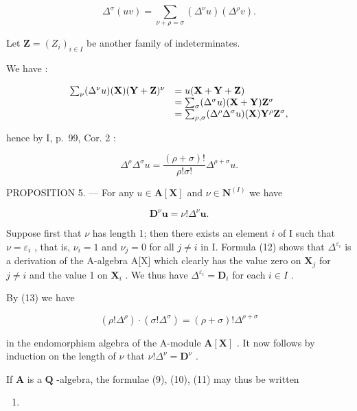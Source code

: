 \[
\Delta^ {\sigma} (u v) = \sum_ {\nu + \rho = \sigma} (\Delta^ {\nu} u) (\Delta^ {\rho} v).
\]

Let \(\mathbf{Z} = (Z_i)_{i\in I}\) be another family of indeterminates.

We have :

\[
\begin{array}{r l} \sum_ {\nu} (\Delta^ {\nu} u) (\mathbf {X}) (\mathbf {Y} + \mathbf {Z}) ^ {\nu} & = u (\mathbf {X} + \mathbf {Y} + \mathbf {Z}) \\ & = \sum_ {\sigma} (\Delta^ {\sigma} u) (\mathbf {X} + \mathbf {Y}) \mathbf {Z} ^ {\sigma} \\ & = \sum_ {\rho , \sigma} (\Delta^ {\rho} \Delta^ {\sigma} u) (\mathbf {X}) \mathbf {Y} ^ {\rho} \mathbf {Z} ^ {\sigma}, \end{array}
\]

hence by I, p.~99, Cor. 2 :

\[
\Delta^ {\rho} \Delta^ {\sigma} u = \frac {(\rho + \sigma) !}{\rho ! \sigma !} \Delta^ {\rho + \sigma} u.\tag{13}
\]

PROPOSITION 5. --- For any \(u \in \mathbf{A}[\mathbf{X}]\) and \(\nu \in \mathbf{N}^{(I)}\) we have

\[
\mathbf {D} ^ {\nu} \boldsymbol {u} = \nu ! \Delta^ {\nu} \boldsymbol {u}.
\]

Suppose first that \(\nu\) has length 1; then there exists an element \(i\) of I such that \(\nu = \varepsilon_i\) , that is, \(\nu_i = 1\) and \(\nu_j = 0\) for all \(j \neq i\) in I. Formula (12) shows that \(\Delta^{\varepsilon_i}\) is a derivation of the A-algebra A{[}X{]} which clearly has the value zero on \(\mathbf{X}_j\) for \(j \neq i\) and the value 1 on \(\mathbf{X}_i\) . We thus have \(\Delta^{\varepsilon_i} = \mathbf{D}_i\) for each \(i \in I\) .

By (13) we have

\[
(\rho ! \Delta^ {\rho}) \cdot (\sigma ! \Delta^ {\sigma}) = (\rho + \sigma)! \Delta^ {\rho + \sigma}\tag{14}
\]

in the endomorphism algebra of the A-module \(\mathbf{A}[\mathbf{X}]\) . It now follows by induction on the length of \(\nu\) that \(\nu! \Delta^{\nu} = \mathbf{D}^{\nu}\) .

If \(\mathbf{A}\) is a \(\mathbf{Q}\) -algebra, the formulae (9), (10), (11) may thus be written

\begin{enumerate}
\def\labelenumi{(\arabic{enumi})}
\setcounter{enumi}{14}
\tightlist
\item
\end{enumerate}

